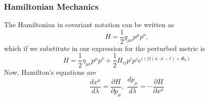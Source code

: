\documentclass[fleqn,usenatbib,useAMS]{mnras}
\begin{document}
\subsubsection{Hamiltonian Mechanics}
The Hamiltonian in covariant notation can be written as 
\begin{equation}
	H = \frac{1}{2} g_{\mu \nu} p^{\mu} p^{\nu},
\end{equation}
\noindent which if we substitute in our expression for the perturbed metric is
\begin{equation}
	H = \frac{1}{2} \eta_{\mu \nu} p^{\mu} p^{\nu} + \frac{1}{2} H_{ij}p^i p^j e^{i(\Omega(\bar{n} \cdot \bar{x} - t) + \Phi_0)	}
\end{equation}
\noindent Now, Hamilton's equations are
\begin{equation}
	\frac{dx^{\mu}}{d\lambda} = \frac{\partial H}{\partial p_{\mu}} , \, \, \frac{dp_{\mu}}{d \lambda} = -\frac{\partial H}{\partial x^{\mu}} 
\end{equation}
\end{document}
